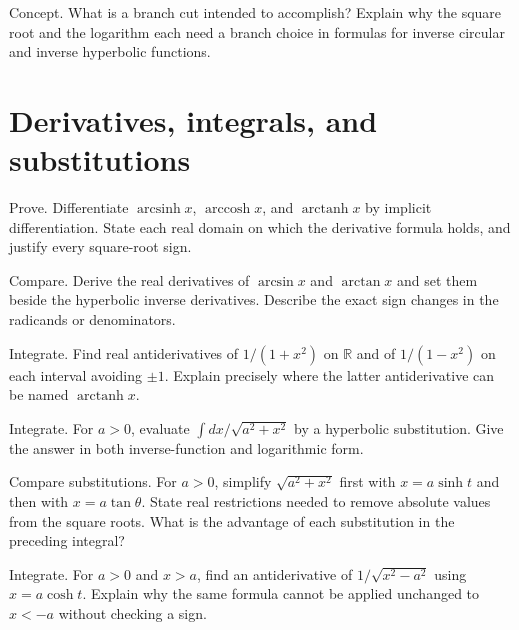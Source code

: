 \documentclass{workbook}
\DeclareMathOperator{\arcsinh}{arcsinh}
\DeclareMathOperator{\arccosh}{arccosh}
\DeclareMathOperator{\arctanh}{arctanh}
\newcommand{\R}{\mathbb{R}}
\begin{document}
\begin{problem}{Concept.}
What is a branch cut intended to accomplish? Explain why the
square root and the logarithm each need a branch choice in formulas
for inverse circular and inverse hyperbolic functions.
\end{problem}

\section{Derivatives, integrals, and substitutions}

\begin{problem}{Prove.}
Differentiate $\arcsinh x$, $\arccosh x$, and $\arctanh x$ by
implicit differentiation. State each real domain on which the
derivative formula holds, and justify every square-root sign.
\end{problem}

\begin{problem}{Compare.}
Derive the real derivatives of $\arcsin x$ and $\arctan x$ and set
them beside the hyperbolic inverse derivatives. Describe the exact
sign changes in the radicands or denominators.
\end{problem}

\begin{problem}{Integrate.}
Find real antiderivatives of $1/(1+x^2)$ on $\R$ and of
$1/(1-x^2)$ on each interval avoiding $\pm1$. Explain precisely
where the latter antiderivative can be named $\arctanh x$.
\end{problem}

\begin{problem}{Integrate.}
For $a>0$, evaluate
$\int dx/\sqrt{a^2+x^2}$ by a hyperbolic substitution.
Give the answer in both inverse-function and logarithmic form.
\end{problem}

\begin{problem}{Compare substitutions.}
For $a>0$, simplify $\sqrt{a^2+x^2}$ first with $x=a\sinh t$
and then with $x=a\tan\theta$. State real restrictions needed to
remove absolute values from the square roots. What is the advantage
of each substitution in the preceding integral?
\end{problem}

\begin{problem}{Integrate.}
For $a>0$ and $x>a$, find an antiderivative of
$1/\sqrt{x^2-a^2}$ using $x=a\cosh t$. Explain why the same
formula cannot be applied unchanged to $x<-a$ without checking a sign.
\end{problem}
\end{document}
